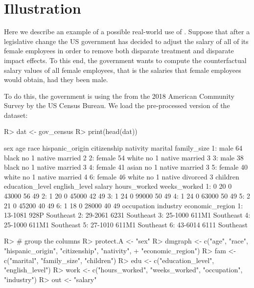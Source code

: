 \documentclass[
  notitle]{jss}
\begin{document}
\hypertarget{illustration}{%
\section{Illustration}\label{illustration}}

\label{Illustration} Here we describe an example of a possible
real-world use of . Suppose that after a legislative
change the US government has decided to adjust the salary of all of its
female employees in order to remove both disparate treatment and
disparate impact effects. To this end, the government wants to compute
the counterfactual salary values of all female employees, that is the
salaries that female employees would obtain, had they been male.

To do this, the government is using the from the 2018 American Community
Survey by the US Census Bureau. We load the pre-processed version of the
dataset:

\begin{CodeChunk}
\begin{CodeInput}
R> dat <- gov_census
R> print(head(dat))
\end{CodeInput}
\begin{CodeOutput}
      sex age  race hispanic_origin citizenship nativity  marital family_size
1:   male  64 black              no           1   native  married           2
2: female  54 white              no           1   native  married           3
3:   male  38 black              no           1   native  married           3
4: female  41 asian              no           1   native  married           3
5: female  40 white              no           1   native  married           4
6: female  46 white              no           1   native divorced           3
   children education_level english_level salary hours_worked weeks_worked
1:        0              20             0  43000           56           49
2:        1              20             0  45000           42           49
3:        1              24             0  99000           50           49
4:        1              24             0  63000           50           49
5:        2              21             0  45200           40           49
6:        1              18             0  28000           40           49
   occupation industry economic_region
1:    13-1081     928P       Southeast
2:    29-2061     6231       Southeast
3:    25-1000    611M1       Southeast
4:    25-1000    611M1       Southeast
5:    27-1010    611M1       Southeast
6:    43-6014     6111       Southeast
\end{CodeOutput}
\begin{CodeInput}
R> # group the columns
R> protect.A <- "sex"
R> dmgraph <- c("age", "race", "hispanic_origin", "citizenship", "nativity",
+   "economic_region")
R> fam <- c("marital", "family_size", "children")
R> edu <- c("education_level", "english_level")
R> work <- c("hours_worked", "weeks_worked", "occupation", "industry")
R> out <- "salary"
\end{CodeInput}
\end{CodeChunk}
\end{document}
